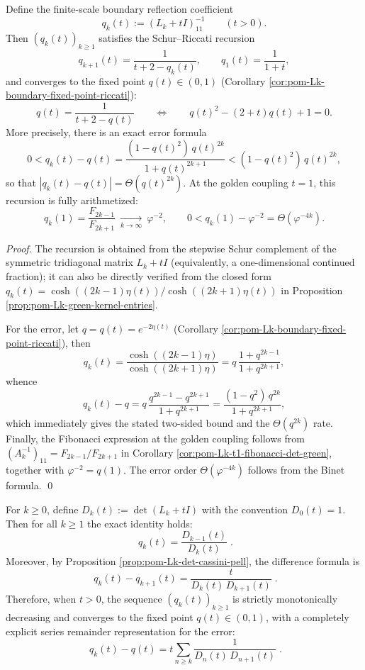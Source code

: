 \begin{proposition}\label{prop:pom-Lk-boundary-riccati-recursion}
Define the finite-scale boundary reflection coefficient
\[
q_k(t):=(L_k+tI)^{-1}_{11}\qquad(t>0).
\]
Then \((q_k(t))_{k\ge 1}\) satisfies the Schur--Riccati recursion
\[
q_{k+1}(t)=\frac{1}{t+2-q_k(t)},\qquad q_1(t)=\frac{1}{1+t},
\]
and converges to the fixed point \(q(t)\in(0,1)\) (Corollary \ref{cor:pom-Lk-boundary-fixed-point-riccati}):
\[
q(t)=\frac{1}{t+2-q(t)}\qquad\Longleftrightarrow\qquad q(t)^2-(2+t)q(t)+1=0.
\]
More precisely, there is an exact error formula
\[
0<q_k(t)-q(t)=\frac{(1-q(t)^2)\,q(t)^{2k}}{1+q(t)^{2k+1}}
< (1-q(t)^2)\,q(t)^{2k},
\]
so that \(|q_k(t)-q(t)|=\Theta(q(t)^{2k})\).
At the golden coupling \(t=1\), this recursion is fully arithmetized:
\[
q_k(1)=\frac{F_{2k-1}}{F_{2k+1}}\ \xrightarrow[k\to\infty]{}\ \varphi^{-2},
\qquad
0<q_k(1)-\varphi^{-2}=\Theta(\varphi^{-4k}).
\]
\end{proposition}
\begin{proof}
The recursion is obtained from the stepwise Schur complement of the symmetric tridiagonal matrix \(L_k+tI\) (equivalently, a one-dimensional continued fraction); it can also be directly verified from the closed form \(q_k(t)=\cosh((2k-1)\eta(t))/\cosh((2k+1)\eta(t))\) in Proposition \ref{prop:pom-Lk-green-kernel-entries}.

For the error, let \(q=q(t)=e^{-2\eta(t)}\) (Corollary \ref{cor:pom-Lk-boundary-fixed-point-riccati}), then
\[
q_k(t)=\frac{\cosh((2k-1)\eta)}{\cosh((2k+1)\eta)}
=q\,\frac{1+q^{2k-1}}{1+q^{2k+1}},
\]
whence
\[
q_k(t)-q=q\,\frac{q^{2k-1}-q^{2k+1}}{1+q^{2k+1}}
=\frac{(1-q^2)\,q^{2k}}{1+q^{2k+1}},
\]
which immediately gives the stated two-sided bound and the \(\Theta(q^{2k})\) rate.
Finally, the Fibonacci expression at the golden coupling follows from \((A_k^{-1})_{11}=F_{2k-1}/F_{2k+1}\) in Corollary \ref{cor:pom-Lk-t1-fibonacci-det-green}, together with \(\varphi^{-2}=q(1)\).
The error order \(\Theta(\varphi^{-4k})\) follows from the Binet formula. \qed
\end{proof}

\begin{corollary}\label{cor:pom-Lk-riccati-error-by-determinants}
For \(k\ge 0\), define \(D_k(t):=\det(L_k+tI)\) with the convention \(D_0(t)=1\).
Then for all \(k\ge 1\) the exact identity holds:
\[
\boxed{\;
q_k(t)=\frac{D_{k-1}(t)}{D_k(t)}\; }.
\]
Moreover, by Proposition \ref{prop:pom-Lk-det-cassini-pell}, the difference formula is
\[
\boxed{\;
q_k(t)-q_{k+1}(t)=\frac{t}{D_k(t)\,D_{k+1}(t)}\; }.
\]
Therefore, when \(t>0\), the sequence \((q_k(t))_{k\ge 1}\) is strictly monotonically decreasing and converges to the fixed point \(q(t)\in(0,1)\), with a completely explicit series remainder representation for the error:
\[
\boxed{\;
q_k(t)-q(t)=t\sum_{n\ge k}\frac{1}{D_n(t)\,D_{n+1}(t)}\; }.
\]
\end{corollary}

